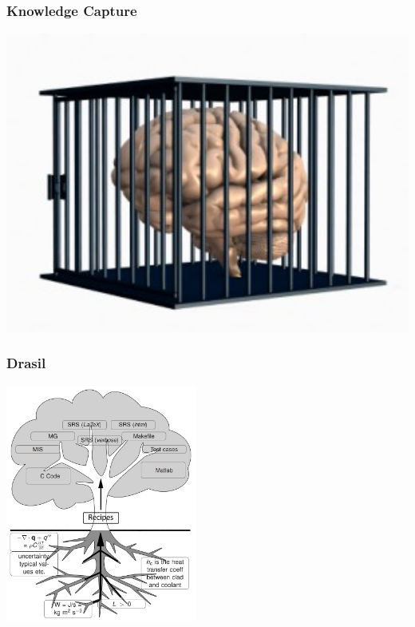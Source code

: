 \documentclass{beamer}
\begin{document}

\begin{frame}

\frametitle{Knowledge Capture}

\includegraphics[width=1.0\textwidth]{KC.jpg}

\end{frame}


\begin{frame}

\frametitle{Drasil}
\begin{center}
\includegraphics[height=21em]{tree.png}
\end{center}
\end{frame}

\end{document}
